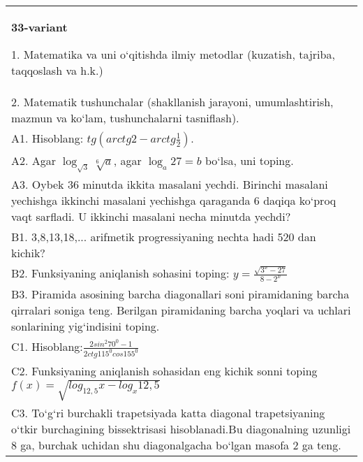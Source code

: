 \documentclass{article}
\begin{document}
\begin{tabular}{m{17cm}}
\textbf{33-variant}

1. Matematika va uni o‘qitishda ilmiy metodlar (kuzatish, tajriba, taqqoslash va h.k.) \\
2. Matematik tushunchalar (shakllanish jarayoni, umumlashtirish, mazmun va ko‘lam, tushunchalarni tasniflash). \\
A1. Hisoblang: \(tg\left (arctg2 - arctg\frac{1}{2} \right) \). \\
A2. Agar \(\log_{\sqrt{3}}\sqrt[6]{a}\), agar \(\log_{a}27 = b\) bo‘lsa, uni toping. \\
A3. Oybek 36 minutda ikkita masalani yechdi. Birinchi masalani yechishga ikkinchi masalani yechishga qaraganda 6 daqiqa ko‘proq vaqt sarfladi. U ikkinchi masalani necha minutda yechdi? \\
B1. 3,8,13,18,... arifmetik progressiyaning nechta hadi 520 dan kichik? \\
B2. Funksiyaning aniqlanish sohasini toping: \(y = \frac{\sqrt{3^{x} - 27}}{8 - 2^{x}}\) \\
B3. Piramida asosining barcha diagonallari soni piramidaning barcha qirralari soniga teng. Berilgan piramidaning barcha yoqlari va uchlari sonlarining yig‘indisini toping. \\
C1. Hisoblang:\(\frac{2sin^{2}70^{0} - 1}{2ctg115^{0}cos155^{0}}\) \\
C2. Funksiyaning aniqlanish sohasidan eng kichik sonni toping \(f (x) = \sqrt{log_{12,5}x - log_{x}12,5}\) \\
C3. To‘g‘ri burchakli trapetsiyada katta diagonal trapetsiyaning o‘tkir burchagining bissektrisasi hisoblanadi.Bu diagonalning uzunligi 8 ga, burchak uchidan shu diagonalgacha bo‘lgan masofa 2 ga teng. \\

\end{tabular}
\vspace{1cm}
\end{document}
